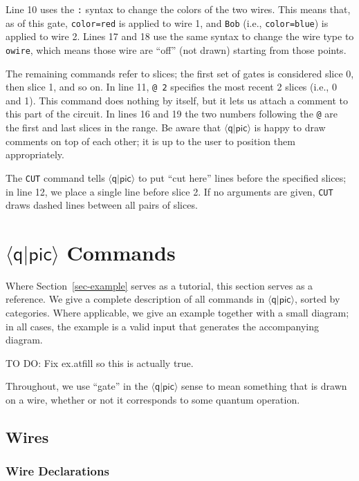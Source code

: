 \documentclass[twoside,12pt]{article}
\newcommand{\qpic}{$\langle\mathsf{q}|\mathsf{pic}\rangle$\xspace}
\begin{document}
Line 10 uses the {\tt :} syntax to change the colors of the two wires.  This
means that, as of this gate, {\tt color=red} is applied to wire 1, and
{\tt Bob} (i.e., {\tt color=blue}) is applied to wire 2.  Lines 17 and 18 use
the same syntax to change the wire type to {\tt owire}, which means those
wire are ``off'' (not drawn) starting from those points.

The remaining commands refer to slices; the first set of gates is
considered slice 0, then slice 1, and so on.  In line 11,
{\tt @ 2} specifies the most recent 2 slices (i.e., 0 and 1).  This
command does nothing by itself, but it lets us attach a comment to this
part of the circuit.  In lines 16 and 19 the two numbers following the
{\tt @} are the first and last slices in the range.  Be aware that
\qpic is happy to draw comments on top of each other; it is up to
the user to position them appropriately.

The {\tt CUT} command tells \qpic to put ``cut here'' lines before
the specified slices; in line 12, we place a single line before
slice 2.  If no arguments are given, {\tt CUT} draws dashed lines
between all pairs of slices.

\section{\qpic Commands}
\label{sec-qpic}

\lstset{basicstyle=\ttfamily\small,numbers=none}

Where Section~\ref{sec-example} serves as a tutorial, this section serves
as a reference.  We give a complete description of all commands in \qpic,
sorted by categories.  Where applicable, we give an example together with
a small diagram; in all cases, the example is a valid input that
generates the accompanying diagram.

TO DO: Fix ex.atfill so this is actually true.

Throughout, we use ``gate'' in the \qpic sense to mean
something that is drawn on a wire, whether or not it corresponds
to some quantum operation.

\subsection{Wires}
\subsubsection{Wire Declarations}
\label{sec-qpic-wire-name-rules}
\end{document}
